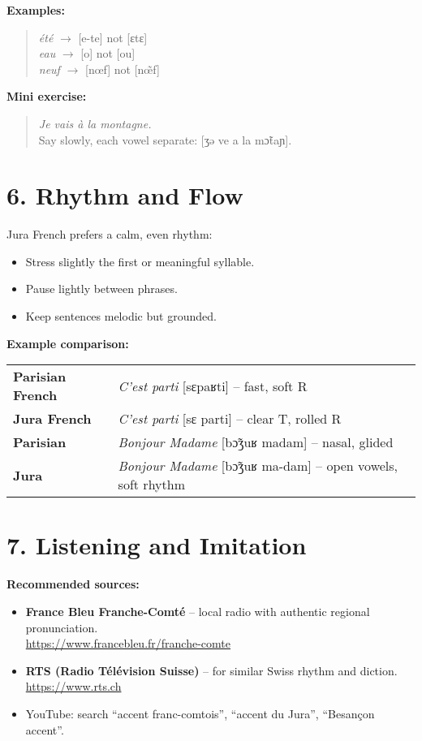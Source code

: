 \documentclass[11pt,a4paper]{article}
\begin{document}
\textbf{Examples:}
\begin{quote}
\textit{été} $\rightarrow$ [e-te] not [ɛtɛ]\\
\textit{eau} $\rightarrow$ [o] not [ou]\\
\textit{neuf} $\rightarrow$ [nœf] not [nœ̃f]
\end{quote}

\textbf{Mini exercise:}
\begin{quote}
\textit{Je vais à la montagne.}\\
Say slowly, each vowel separate: [ʒə ve a la mɔ̃taɲ].
\end{quote}

\vspace{0.5em}

\section*{6. Rhythm and Flow}

Jura French prefers a calm, even rhythm:
\begin{itemize}
  \item Stress slightly the first or meaningful syllable.
  \item Pause lightly between phrases.
  \item Keep sentences melodic but grounded.
\end{itemize}

\textbf{Example comparison:}

\begin{tabular}{|m{4cm}|m{10cm}|}
\hline
\textbf{Parisian French} & \textit{C’est parti} [sɛpaʁti] – fast, soft R \\
\textbf{Jura French} & \textit{C’est parti} [sɛ parti] – clear T, rolled R \\
\hline
\textbf{Parisian} & \textit{Bonjour Madame} [bɔ̃ʒuʁ madam] – nasal, glided \\
\textbf{Jura} & \textit{Bonjour Madame} [bɔ̃ʒuʁ ma-dam] – open vowels, soft rhythm \\
\hline
\end{tabular}

\vspace{0.5em}

\section*{7. Listening and Imitation}

\textbf{Recommended sources:}
\begin{itemize}
  \item \textbf{France Bleu Franche-Comté} – local radio with authentic regional pronunciation.\\
  \url{https://www.francebleu.fr/franche-comte}
  \item \textbf{RTS (Radio Télévision Suisse)} – for similar Swiss rhythm and diction.\\
  \url{https://www.rts.ch}
  \item YouTube: search “accent franc-comtois”, “accent du Jura”, “Besançon accent”.
\end{itemize}
\end{document}
